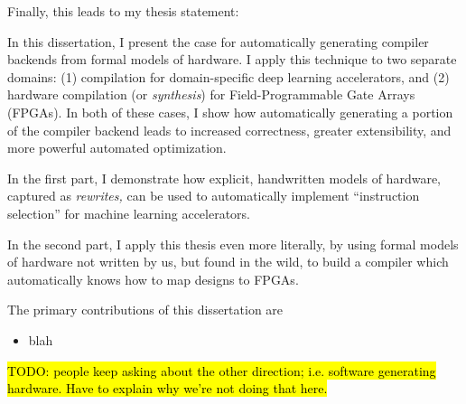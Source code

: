 Finally, this leads to my thesis statement:

\begin{mdframed}
\mythesis
\end{mdframed}

In this dissertation,
  I present the case for
  automatically generating compiler backends
  from
  formal models of hardware.
I apply this technique
  to two separate domains:
  (1) compilation for
  domain-specific 
  deep learning accelerators,
  and
  (2) hardware compilation 
  (or \textit{synthesis})
  for Field-Programmable
  Gate Arrays (FPGAs).
In both of these cases,
  I show how
  automatically generating
  a portion of the compiler backend
  leads to increased correctness,
  greater extensibility,
  and more powerful automated optimization.

In the first part,
  I demonstrate
  how explicit,
  handwritten
  models of hardware,
  captured as
  \textit{rewrites,}
  can be used 
  to automatically implement
  ``instruction selection''
  for machine learning
  accelerators.

In the second part,
  I apply this thesis
  even more literally, by using
  formal models of hardware
  not written by us,
  but found in the wild,
  to build a compiler
  which automatically knows
  how to map designs
  to FPGAs.

The primary contributions of this dissertation
  are
\begin{itemize}

    \item blah
\end{itemize}


\hl{
TODO: people keep asking about the other direction;
  i.e. software generating hardware.
Have to explain why we're not doing that here.
}
  



